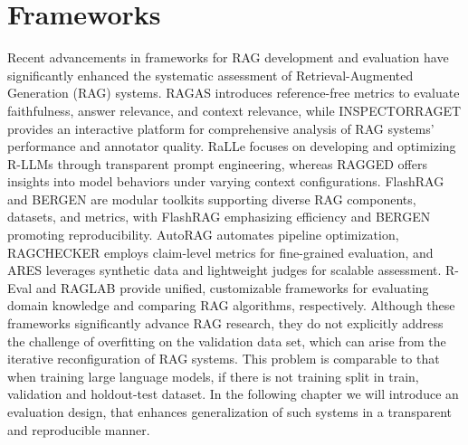 \section{Frameworks}
Recent advancements in frameworks for RAG development and evaluation have significantly enhanced the systematic assessment of Retrieval-Augmented Generation (RAG) systems. RAGAS\cite{Es.2023} introduces reference-free metrics to evaluate faithfulness, answer relevance, and context relevance, while INSPECTORRAGET\cite{Fadnis.26.04.2024} provides an interactive platform for comprehensive analysis of RAG systems' performance and annotator quality. RaLLe\cite{Hoshi.8212023b} focuses on developing and optimizing R-LLMs through transparent prompt engineering, whereas RAGGED\cite{JenniferHsia.2024} offers insights into model behaviors under varying context configurations. FlashRAG\cite{Jin.5222024} and BERGEN\cite{Rau.01.07.2024} are modular toolkits supporting diverse RAG components, datasets, and metrics, with FlashRAG emphasizing efficiency and BERGEN promoting reproducibility. AutoRAG\cite{Kim.10282024} automates pipeline optimization, RAGCHECKER\cite{Ru.15.08.2024} employs claim-level metrics for fine-grained evaluation, and ARES\cite{SaadFalcon.16.11.2023} leverages synthetic data and lightweight judges for scalable assessment. R-Eval\cite{Tu.2024} and RAGLAB\cite{Zhang.8212024} provide unified, customizable frameworks for evaluating domain knowledge and comparing RAG algorithms, respectively. Although these frameworks significantly advance RAG research, they do not explicitly address the challenge of overfitting on the validation data set, which can arise from the iterative reconfiguration of RAG systems.  This problem is comparable to that when training large language models, if there is not training split in train, validation and holdout-test dataset. In the following chapter we will introduce an evaluation design, that enhances generalization of such systems in a transparent and reproducible manner.